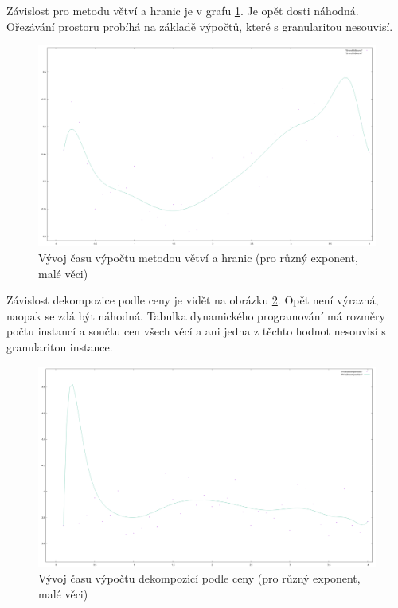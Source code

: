 \documentclass[12pt,a4paper]{article}
\begin{document}
Závislost pro metodu větví a hranic je v grafu \ref{exp/small/BranchNBound}. Je opět dosti náhodná. Ořezávání prostoru probíhá na základě výpočtů, které s granularitou nesouvisí. 

\begin{figure}[H]
\begin{center}
\includegraphics[width=\textwidth]{exp/small/BranchNBound}
\caption{Vývoj času výpočtu metodou větví a hranic (pro různý exponent, malé věci)}
\label{exp/small/BranchNBound}
\end{center}
\end{figure}

Závislost dekompozice podle ceny je vidět na obrázku \ref{exp/small/PriceDecomposition}. Opět není výrazná, naopak se zdá být náhodná. Tabulka dynamického programování má rozměry počtu instancí a součtu cen všech věcí a ani jedna z těchto hodnot nesouvisí s granularitou instance.

\begin{figure}[H]
\begin{center}
\includegraphics[width=\textwidth]{exp/small/PriceDecomposition}
\caption{Vývoj času výpočtu dekompozicí podle ceny (pro různý exponent, malé věci)}
\label{exp/small/PriceDecomposition}
\end{center}
\end{figure}
\end{document}
